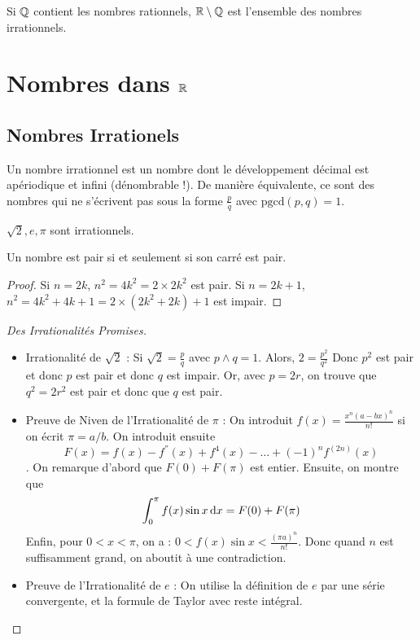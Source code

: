 \documentclass{cours}
\begin{document}
    Si $\mathbb{Q}$ contient les nombres rationnels, $\mathbb{R} \setminus \mathbb{Q}$ est l'ensemble des nombres irrationnels.

    \section{Nombres dans $\mathbb{R}$}
    \subsection{Nombres Irrationels}
    \begin{definition}
        Un nombre irrationnel est un nombre dont le développement décimal est apériodique et infini (dénombrable !). De manière équivalente, ce sont des nombres qui ne s'écrivent pas sous la forme $\frac{p}{q}$ avec $\text{pgcd}(p, q) = 1$.
    \end{definition}

    \begin{proposition}
        $\sqrt{2}, e, \pi$ sont irrationnels.
    \end{proposition}
    \begin{lemma}
        Un nombre est pair si et seulement si son carré est pair.
    \end{lemma}
    \begin{proof}
        Si $n = 2k$, $n^{2} = 4k^{2} = 2\times 2k^{2}$ est pair. Si $n = 2k +1$, $n^{2} = 4k^{2} + 4k + 1 = 2\times(2k^{2} + 2k) + 1$ est impair.
    \end{proof}
    \begin{proof}[Des Irrationalités Promises]
        \begin{itemize}
            \item Irrationalité de $\sqrt{2}$ : Si $\sqrt{2} = \frac{p}{q}$ avec $p \wedge q = 1$. Alors, $2 = \frac{p^{2}}{q^{2}}$ Donc $p^{2}$ est pair et donc $p$ est pair et donc $q$ est impair. Or, avec $p = 2r$, on trouve que $q^{2} = 2r^{2}$ est pair et donc que $q$ est pair.
            \item Preuve de Niven de l'Irrationalité de $\pi$ : On introduit $f(x) = \frac{x^{n}(a-bx)^{n}}{n!}$ si on écrit $\pi = a/b$. On introduit ensuite \[F(x) = f(x) - f^{''}(x) + f^{4}(x) - \ldots + \left(-1\right)^{n}f^{(2n)}(x)\]. On remarque d'abord que $F(0) + F(\pi)$ est entier. Ensuite, on montre que \[\int_{0}^{\pi}f(x) \sin x {\rm \, d} x = F(0) + F(\pi)\] Enfin, pour $0 < x < \pi$, on a : $0 < f(x)\sin x < \frac{\left(\pi a\right)^{n}}{n!}$. Donc quand $n$ est suffisamment grand, on aboutit à une contradiction. 
            \item Preuve de l'Irrationalité de $e$ : On utilise la définition de $e$ par une série convergente, et la formule de Taylor avec reste intégral. 
        \end{itemize}
    \end{proof}
\end{document}
